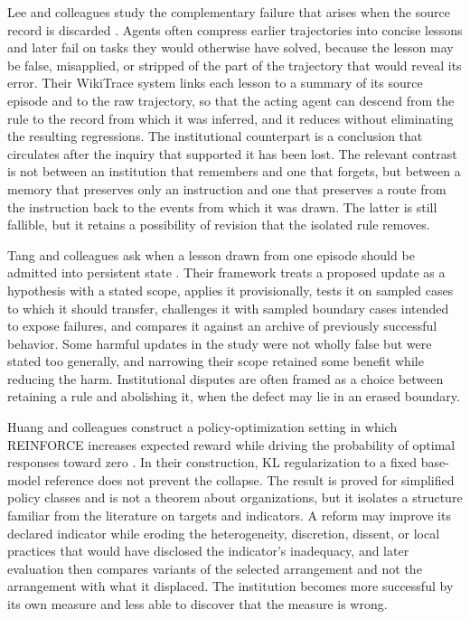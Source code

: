 \documentclass[11pt]{article}
\theoremstyle{definition}
\begin{document}
Lee and colleagues study the complementary failure that arises when the source record is discarded \cite{lee2026}. Agents often compress earlier trajectories into concise lessons and later fail on tasks they would otherwise have solved, because the lesson may be false, misapplied, or stripped of the part of the trajectory that would reveal its error. Their WikiTrace system links each lesson to a summary of its source episode and to the raw trajectory, so that the acting agent can descend from the rule to the record from which it was inferred, and it reduces without eliminating the resulting regressions. The institutional counterpart is a conclusion that circulates after the inquiry that supported it has been lost. The relevant contrast is not between an institution that remembers and one that forgets, but between a memory that preserves only an instruction and one that preserves a route from the instruction back to the events from which it was drawn. The latter is still fallible, but it retains a possibility of revision that the isolated rule removes.

Tang and colleagues ask when a lesson drawn from one episode should be admitted into persistent state \cite{tang2026}. Their framework treats a proposed update as a hypothesis with a stated scope, applies it provisionally, tests it on sampled cases to which it should transfer, challenges it with sampled boundary cases intended to expose failures, and compares it against an archive of previously successful behavior. Some harmful updates in the study were not wholly false but were stated too generally, and narrowing their scope retained some benefit while reducing the harm. Institutional disputes are often framed as a choice between retaining a rule and abolishing it, when the defect may lie in an erased boundary.

Huang and colleagues construct a policy-optimization setting in which REINFORCE increases expected reward while driving the probability of optimal responses toward zero \cite{huang2026}. In their construction, KL regularization to a fixed base-model reference does not prevent the collapse. The result is proved for simplified policy classes and is not a theorem about organizations, but it isolates a structure familiar from the literature on targets and indicators. A reform may improve its declared indicator while eroding the heterogeneity, discretion, dissent, or local practices that would have disclosed the indicator's inadequacy, and later evaluation then compares variants of the selected arrangement and not the arrangement with what it displaced. The institution becomes more successful by its own measure and less able to discover that the measure is wrong.
\end{document}
